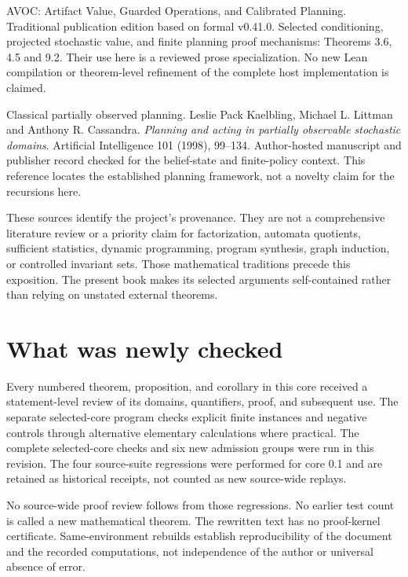 \begin{description}[style=nextline]
\item[AVOC] AVOC: Artifact Value, Guarded Operations, and Calibrated Planning.
Traditional publication edition based on formal v0.41.0. Selected conditioning, projected stochastic value, and finite planning proof mechanisms: Theorems 3.6, 4.5 and 9.2. Their use here is a reviewed prose specialization. No new Lean compilation or theorem-level refinement of the complete host implementation is claimed.

\item[KLC] Classical partially observed planning.
Leslie Pack Kaelbling, Michael L. Littman and Anthony R. Cassandra. \emph{Planning and acting in partially observable stochastic domains}. Artificial Intelligence 101 (1998), 99--134. Author-hosted manuscript and publisher record checked for the belief-state and finite-policy context. This reference locates the established planning framework, not a novelty claim for the recursions here.


\end{description}

These sources identify the project's provenance. They are not a comprehensive literature review or a priority claim for factorization, automata quotients, sufficient statistics, dynamic programming, program synthesis, graph induction, or controlled invariant sets. Those mathematical traditions precede this exposition. The present book makes its selected arguments self-contained rather than relying on unstated external theorems.

\section*{What was newly checked}
Every numbered theorem, proposition, and corollary in this core received a statement-level review of its domains, quantifiers, proof, and subsequent use. The separate selected-core program checks explicit finite instances and negative controls through alternative elementary calculations where practical. The complete selected-core checks and six new admission groups were run in this revision. The four source-suite regressions were performed for core 0.1 and are retained as historical receipts, not counted as new source-wide replays.

No source-wide proof review follows from those regressions. No earlier test count is called a new mathematical theorem. The rewritten text has no proof-kernel certificate. Same-environment rebuilds establish reproducibility of the document and the recorded computations, not independence of the author or universal absence of error.


